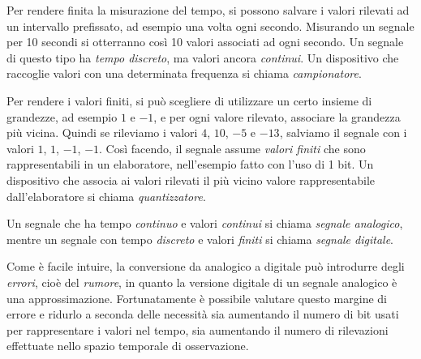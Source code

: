 Per rendere finita la misurazione del tempo, si possono salvare i valori
rilevati ad un intervallo prefissato, ad esempio una volta ogni secondo.
Misurando un segnale per 10 secondi si otterranno cos\`i 10 valori associati ad
ogni secondo. Un segnale di questo tipo ha \emph{tempo discreto}, ma valori
ancora \emph{continui}. Un dispositivo che raccoglie valori con una determinata
frequenza si chiama \emph{campionatore}.

Per rendere i valori finiti, si pu\`o scegliere di utilizzare un certo insieme
di grandezze, ad esempio $1$ e $-1$, e per ogni valore rilevato, associare la
grandezza pi\`u vicina. Quindi se rileviamo i valori $4$, $10$, $-5$ e $-13$,
salviamo il segnale con i valori $1$, $1$, $-1$, $-1$. Cos\`i facendo, il
segnale assume \emph{valori finiti} che sono rappresentabili in un elaboratore,
nell'esempio fatto con l'uso di 1 bit. Un dispositivo che associa ai valori
rilevati il pi\`u vicino valore rappresentabile dall'elaboratore si chiama
\emph{quantizzatore}.

Un segnale che ha tempo \emph{continuo} e valori \emph{continui} si chiama
\emph{segnale analogico}, mentre un segnale con tempo \emph{discreto} e valori
\emph{finiti} si chiama \emph{segnale digitale}.

Come \`e facile intuire, la conversione da analogico a digitale pu\`o introdurre
degli \emph{errori}, cio\`e del \emph{rumore}, in quanto la versione digitale di
un segnale analogico \`e una approssimazione. Fortunatamente \`e possibile
valutare questo margine di errore e ridurlo a seconda delle necessit\`a sia
aumentando il numero di bit usati per rappresentare i valori nel tempo, sia
aumentando il numero di rilevazioni effettuate nello spazio temporale di
osservazione.

